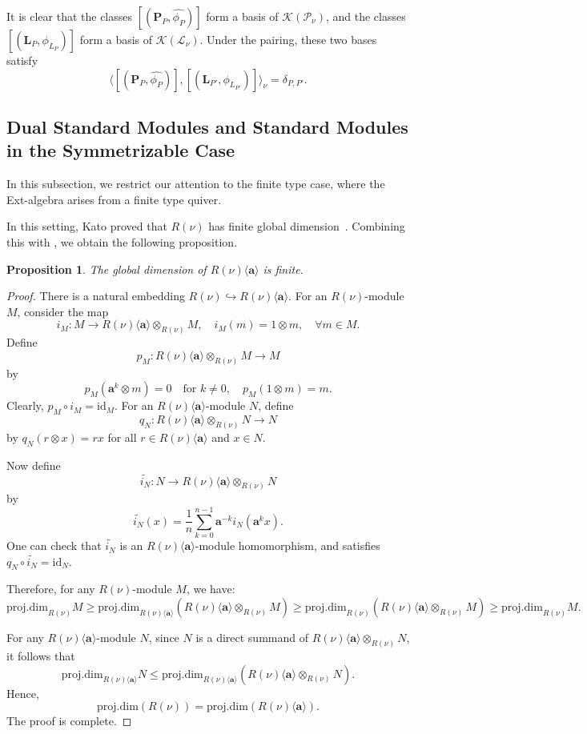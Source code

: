 \documentclass[10pt,a4paper]{amsart}
\newtheorem{proposition}[theorem]{Proposition}
\begin{document}
It is clear that the classes $[(\mathbf{P}_P,\hat{\phi_P})]$ form a basis of $\mathcal{K}(\mathcal{P}_{\nu})$, and the classes $[(\mathbf{L}_P,\phi_{L_P})]$ form a basis of $\mathcal{K}(\mathcal{L}_{\nu})$. Under the pairing, these two bases satisfy
\[
\langle [(\mathbf{P}_P,\hat{\phi_P})], [(\mathbf{L}_{P'},\phi_{L_{P'}})] \rangle_{\nu} = \delta_{P,P'}.
\]

\subsection{Dual Standard Modules and Standard Modules in the Symmetrizable Case}\label{dual standard}
In this subsection, we restrict our attention to the finite type case, where the Ext-algebra arises from a finite type quiver.

In this setting, Kato proved that $R(\nu)$ has finite global dimension~\cite{cd088214-009e-3813-9a86-97f9a299a24c}. Combining this with \cite[Lemma 3.1]{REITEN1985224}, we obtain the following proposition.
\begin{proposition}
The global dimension of $R(\nu)\langle\mathbf{a}\rangle$ is finite.
\end{proposition}

\begin{proof}
There is a natural embedding $R(\nu) \hookrightarrow R(\nu)\langle\mathbf{a}\rangle$. For an $R(\nu)$-module $M$, consider the map
\[
i_M : M \to R(\nu)\langle\mathbf{a}\rangle \otimes_{R(\nu)} M, \quad i_M(m) = 1 \otimes m, \quad \forall m \in M.
\]
Define
\[
p_M : R(\nu)\langle\mathbf{a}\rangle \otimes_{R(\nu)} M \to M
\]
by
\[
p_M(\mathbf{a}^k \otimes m) = 0 \quad \text{for } k \ne 0, \quad p_M(1 \otimes m) = m.
\]
Clearly, $p_M \circ i_M = \mathrm{id}_M$. For an $R(\nu)\langle\mathbf{a}\rangle$-module $N$, define
\[
q_N : R(\nu)\langle\mathbf{a}\rangle \otimes_{R(\nu)} N \to N
\]
by $q_N(r \otimes x) = r x$ for all $r \in R(\nu)\langle\mathbf{a}\rangle$ and $x \in N$.

Now define
\[
\tilde{i_N} : N \to R(\nu)\langle\mathbf{a}\rangle \otimes_{R(\nu)} N
\]
by
\[
\tilde{i_N}(x) = \frac{1}{n} \sum_{k=0}^{n-1} \mathbf{a}^{-k} i_N(\mathbf{a}^k x).
\]
One can check that $\tilde{i_N}$ is an $R(\nu)\langle\mathbf{a}\rangle$-module homomorphism, and satisfies $q_N \circ \tilde{i_N} = \mathrm{id}_N$.

Therefore, for any $R(\nu)$-module $M$, we have:
\[
\mathrm{proj.dim}_{R(\nu)} M \geq \mathrm{proj.dim}_{R(\nu)\langle\mathbf{a}\rangle}(R(\nu)\langle\mathbf{a}\rangle \otimes_{R(\nu)} M)
\geq \mathrm{proj.dim}_{R(\nu)}(R(\nu)\langle\mathbf{a}\rangle \otimes_{R(\nu)} M) \geq \mathrm{proj.dim}_{R(\nu)} M.
\]

For any $R(\nu)\langle\mathbf{a}\rangle$-module $N$, since $N$ is a direct summand of $R(\nu)\langle\mathbf{a}\rangle \otimes_{R(\nu)} N$, it follows that
\[
\mathrm{proj.dim}_{R(\nu)\langle\mathbf{a}\rangle} N \leq \mathrm{proj.dim}_{R(\nu)\langle\mathbf{a}\rangle}(R(\nu)\langle\mathbf{a}\rangle \otimes_{R(\nu)} N).
\]
Hence,
\[
\mathrm{proj.dim}(R(\nu)) = \mathrm{proj.dim}(R(\nu)\langle\mathbf{a}\rangle).
\]
The proof is complete.
\end{proof}
\end{document}
